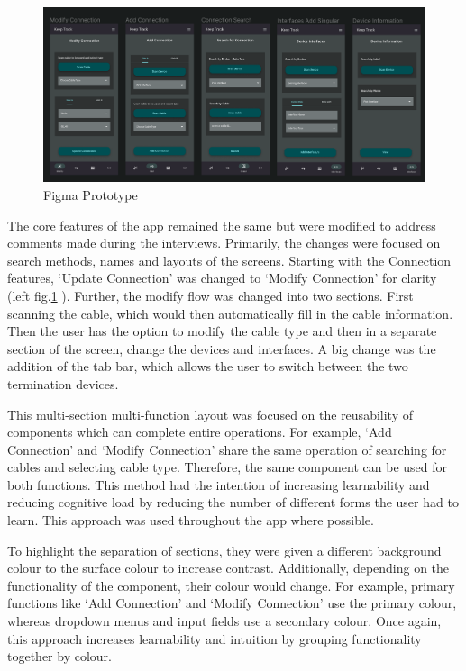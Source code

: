 \documentclass [11pt,a4paper]{article}
\begin{document}
\begin{figure}[H]
    \centering
    \includegraphics[width=1\textwidth]{images/figma_prototype.png}
    \caption{Figma Prototype}
    \label{fig:figma}
\end{figure}

The core features of the app remained the same but were modified to address comments made during the interviews. Primarily, the changes were focused on search methods, names and layouts of the screens. Starting with the Connection features, `Update Connection' was changed to `Modify Connection' for clarity (left fig.\ref{fig:figma} ). Further, the modify flow was changed into two sections. First scanning the cable, which would then automatically fill in the cable information. Then the user has the option to modify the cable type and then in a separate section of the screen, change the devices and interfaces. A big change was the addition of the tab bar, which allows the user to switch between the two termination devices. 

This multi-section multi-function layout was focused on the reusability of components which can complete entire operations. For example, `Add Connection' and `Modify Connection' share the same operation of searching for cables and selecting cable type. Therefore, the same component can be used for both functions. This method had the intention of increasing learnability and reducing cognitive load by reducing the number of different forms the user had to learn. This approach was used throughout the app where possible. 

To highlight the separation of sections, they were given a different background colour to the surface colour to increase contrast. Additionally, depending on the functionality of the component, their colour would change. For example, primary functions like `Add Connection' and `Modify Connection' use the primary colour, whereas dropdown menus and input fields use a secondary colour. Once again, this approach increases learnability and intuition by grouping functionality together by colour.
\end{document}
